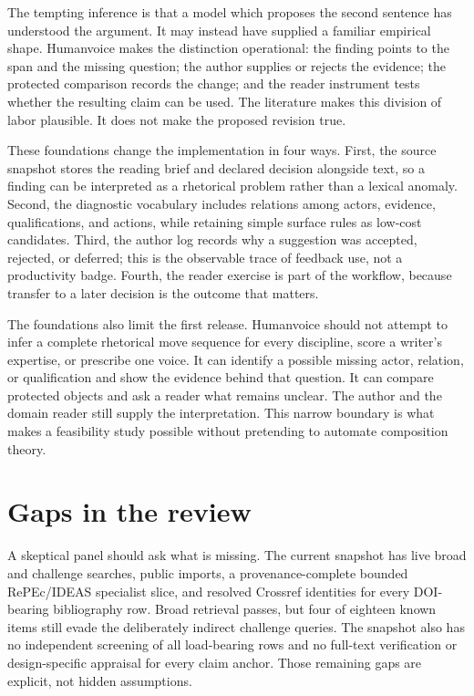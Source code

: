 The tempting inference is that a model which proposes the second sentence has
understood the argument. It may instead have supplied a familiar empirical
shape. Humanvoice makes the distinction operational: the finding points to the
span and the missing question; the author supplies or rejects the evidence; the
protected comparison records the change; and the reader instrument tests
whether the resulting claim can be used. The literature makes this division of
labor plausible. It does not make the proposed revision true.

These foundations change the implementation in four ways. First, the source
snapshot stores the reading brief and declared decision alongside text, so a
finding can be interpreted as a rhetorical problem rather than a lexical
anomaly. Second, the diagnostic vocabulary includes relations among actors,
evidence, qualifications, and actions, while retaining simple surface rules
as low-cost candidates. Third, the author log records why a suggestion was
accepted, rejected, or deferred; this is the observable trace of feedback use,
not a productivity badge. Fourth, the reader exercise is part of the workflow,
because transfer to a later decision is the outcome that matters.

The foundations also limit the first release. Humanvoice should not attempt to
infer a complete rhetorical move sequence for every discipline, score a
writer's expertise, or prescribe one voice. It can identify a possible missing
actor, relation, or qualification and show the evidence behind that question.
It can compare protected objects and ask a reader what remains unclear. The
author and the domain reader still supply the interpretation. This narrow
boundary is what makes a feasibility study possible without pretending to
automate composition theory.

\section{Gaps in the review}
\label{sec:lit-gaps}

A skeptical panel should ask what is missing. The current snapshot has live
broad and challenge searches, public imports, a provenance-complete bounded
RePEc/IDEAS specialist slice, and resolved Crossref identities for every
DOI-bearing bibliography row. Broad retrieval passes, but four of eighteen
known items still evade the deliberately indirect challenge queries. The
snapshot also has no independent screening of all load-bearing rows and no
full-text verification or design-specific appraisal for every claim anchor.
Those remaining gaps are explicit, not hidden assumptions.

